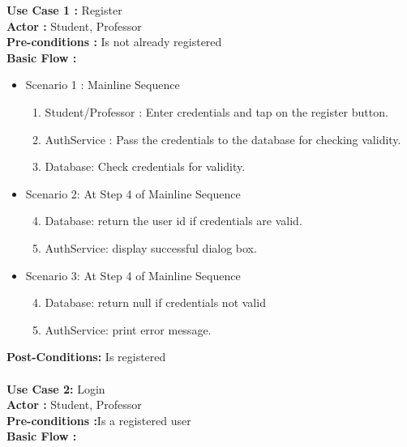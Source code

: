 \documentclass{article}
\begin{document}
\textbf{Use Case 1 :} Register \\
\textbf{Actor :} Student, Professor \\
\textbf{Pre-conditions :} Is not already registered\\
\textbf{Basic Flow :}
\begin{itemize}
    \item Scenario 1 : Mainline Sequence
        \begin{enumerate}
            \item Student/Professor : Enter credentials and tap on the register button.
            \item AuthService : Pass the credentials to the database for checking validity.
            \item  Database:  Check credentials for validity.        
\end{enumerate}
   \item Scenario 2: At Step 4 of Mainline Sequence 
        \begin{enumerate}
            \setcounter{enumi}{3}
            \item Database: return the user id if credentials are valid.
	\item AuthService: display successful dialog box. 
        \end{enumerate}  
    \item Scenario 3: At Step 4 of Mainline Sequence 
        \begin{enumerate}
            \setcounter{enumi}{3}
            \item Database: return null if credentials not valid
	\item AuthService: print error message. 
        \end{enumerate}  
\end{itemize}
\textbf{Post-Conditions:} Is registered\\ \\
\textbf{Use Case 2:} Login\\
\textbf{Actor :} Student, Professor \\
\textbf{Pre-conditions :}Is a registered user\\
\textbf{Basic Flow :} 
\end{document}
